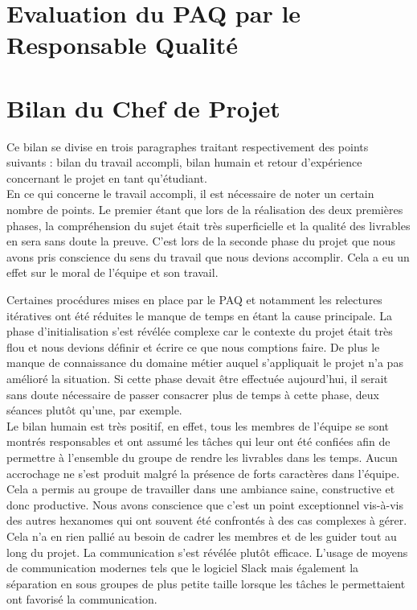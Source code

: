 \section{Evaluation du PAQ par le Responsable Qualité}


\section{Bilan du Chef de Projet}

Ce bilan se divise en trois paragraphes traitant respectivement des points suivants : bilan du travail accompli, bilan humain et retour d’expérience concernant le projet en tant qu’étudiant. \\

En ce qui concerne le travail accompli, il est nécessaire de noter un certain nombre de points. Le premier étant que lors de la réalisation des deux premières phases, la compréhension du sujet était très superficielle et la qualité des livrables en sera sans doute la preuve. C’est lors de la seconde phase du projet que nous avons pris conscience du sens du travail que nous devions accomplir. Cela a eu un effet sur le moral de l’équipe et son travail.

Certaines procédures mises en place par le PAQ et notamment les relectures itératives ont été réduites le manque de temps en étant la cause principale. La phase d’initialisation s’est révélée complexe car le contexte du projet était très flou et nous devions définir et écrire ce que nous comptions faire. De plus le manque de connaissance du domaine métier auquel s’appliquait le projet n’a pas amélioré la situation. Si cette phase devait être effectuée aujourd’hui, il serait sans doute nécessaire de passer consacrer plus de temps à cette phase, deux séances plutôt qu’une, par exemple. \\

Le bilan humain est très positif, en effet, tous les membres de l’équipe se sont montrés responsables et ont assumé les tâches qui leur ont été confiées afin de permettre à l’ensemble du groupe de rendre les livrables dans les temps. Aucun accrochage ne s’est produit malgré la présence de forts caractères dans l’équipe. Cela a permis au groupe de travailler dans une ambiance saine, constructive et donc productive. Nous avons conscience que c’est un point exceptionnel vis-à-vis des autres hexanomes qui ont souvent été confrontés à des cas complexes à gérer. Cela n’a en rien pallié au besoin de cadrer les membres et de les guider tout au long du projet. La communication s’est révélée plutôt efficace. L’usage de moyens de communication modernes tels que le logiciel Slack mais également la séparation en sous groupes de plus petite taille lorsque les tâches le permettaient ont favorisé la communication. 

